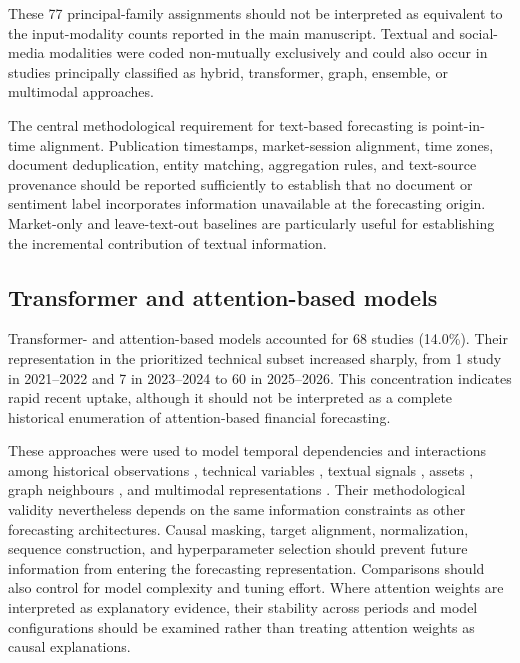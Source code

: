\documentclass[12pt]{article}
\numberwithin{equation}{section}
\begin{document}
These 77 principal-family assignments should not be interpreted as equivalent
to the input-modality counts reported in the main manuscript. Textual and
social-media modalities were coded non-mutually exclusively and could also
occur in studies principally classified as hybrid, transformer, graph,
ensemble, or multimodal approaches.

The central methodological requirement for text-based forecasting is
point-in-time alignment. Publication timestamps, market-session alignment,
time zones, document deduplication, entity matching, aggregation rules, and
text-source provenance should be reported sufficiently to establish that no
document or sentiment label incorporates information unavailable at the
forecasting origin. Market-only and leave-text-out baselines are particularly
useful for establishing the incremental contribution of textual information.

\subsection{Transformer and attention-based models}
\label{sec:supp-transformers}

Transformer- and attention-based models accounted for 68 studies (14.0\%).
Their representation in the prioritized technical subset increased sharply,
from 1 study in 2021--2022 and 7 in 2023--2024 to 60 in 2025--2026.
This concentration indicates rapid recent uptake, although it should not be
interpreted as a complete historical enumeration of attention-based financial
forecasting.

These approaches were used to model temporal dependencies \cite{P00040,P00062,P00089,P00107} and interactions
among historical observations \cite{P00189,P00282,P00291}, technical variables \cite{P00303,P00331,P00364,P00377,P00385}, textual signals \cite{P00403,P00451,P00517,P00571,P00579}, assets \cite{P00635,P00687,P00707,P00831,P00858,P00876,P00895},
graph neighbours \cite{P00896,P00938,P00966}, and multimodal representations \cite{P01035,P01084,P01137,P01187,P01193,P01424,P01738,P02987,P04538}. Their methodological
validity nevertheless depends on the same information constraints as other
forecasting architectures. Causal masking, target alignment, normalization,
sequence construction, and hyperparameter selection should prevent future
information from entering the forecasting representation. Comparisons should
also control for model complexity and tuning effort. Where attention weights
are interpreted as explanatory evidence, their stability across periods and
model configurations should be examined rather than treating attention
weights as causal explanations.
\end{document}

